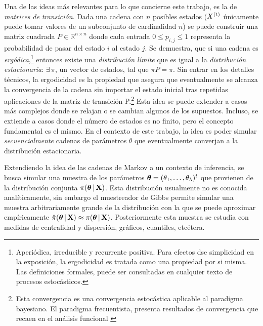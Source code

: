 \documentclass[../Main/Main.tex]{subfiles}
\begin{document}
Una de las ideas más relevantes para lo que concierne este trabajo, es la de \textit{matrices de transición}. Dada una cadena con $n$ posibles estados ($X^{(t)}$ únicamente puede tomar valores de un subconjunto de cardinalidad $n$) se puede construir una matriz cuadrada $P\in\mathbb{R}^{n\times n}$ donde cada entrada $0\leq p_{i,j}\leq1$ representa la probabilidad de pasar del estado $i$ al estado $j$. Se demuestra, que si una cadena es \textit{ergódica},\footnote{Aperiódica, irreducible y  recurrente positiva. Para efectos dse simplicidad en la exposición, la ergodicidad es tratada como una propiedad por si misma. Las definiciones formales, puede ser consultadas en cualquier texto de procesos estocásticos.} entonces existe una \textit{distribución límite} que es igual a la \textit{distribución estacionaria}: $\exists \,\pi$, un vector de estados, tal que $\pi P = \pi$. Sin entrar en los detalles técnicos, la ergodicidad es la propiedad que asegura que eventualmente se alcanza la convergencia de la cadena sin importar el estado inicial tras repetidas aplicaciones de la matriz de transición P.\footnote{Esta convergencia es una convergencia estocástica aplicable al paradigma bayesiano. El paradigma frecuentista, presenta resultados de convergencia que recaen en el análisis funcional \autocite{stone1985additive}} 
Esta idea se puede extender a casos más complejos donde se relajan o se cambian algunos de los supuestos. Incluso, se extiende a casos donde el número de estados es no finito, pero el concepto fundamental es el mismo.  En el contexto de este trabajo, la idea es poder simular \textit{secuencialmente} cadenas de parámetros $\theta$ que eventualmente converjan a la distribución estacionaria. 

Extendiendo la idea de las cadenas de Markov a un contexto de inferencia, se busca simular una muestra de los parámetros $\bm{\theta} = (\theta_1,\ldots,\theta_\lambda)^t$ que provienen de la distribución conjunta $\pi(\bm{\theta} \,|\, \mathbf{X})$. Esta distribución usualmente no es conocida analíticamente, sin embargo el muestreador de Gibbs permite simular una muestra arbitrariamente grande de la distribución con la que se puede aproximar empíricamente $\hat{\pi}(\bm{\theta}\,|\, \mathbf{X}) \approx \pi(\bm{\theta} \,|\, \mathbf{X})$. Posteriormente esta muestra se estudia con medidas de centralidad y dispersión, gráficos, cuantiles, etcétera.
\end{document}
